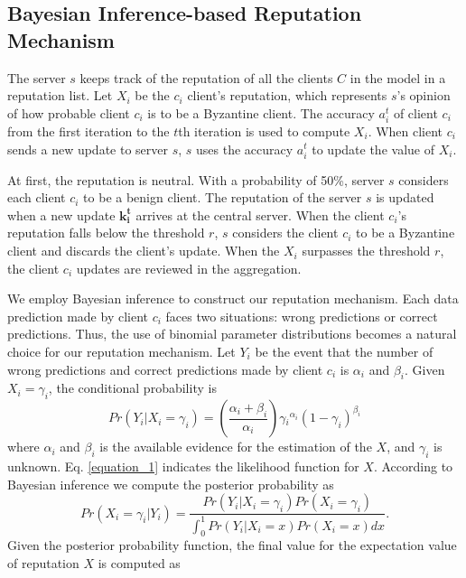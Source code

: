 \documentclass[journal]{IEEEtran}
\begin{document}
\subsection{Bayesian Inference-based Reputation Mechanism}
The server $s$ keeps track of the reputation of all the clients $C$ in the model in a reputation list. Let $X_i$ be the $c_i$ client's reputation, which represents $s$'s opinion of how probable client $c_i$ is to be a Byzantine client. The accuracy $a_i^t$ of client $c_i$ from the first iteration to the $t$th iteration is used to compute $X_i$. When client $c_i$ sends a new update to server $s$, $s$ uses the accuracy $a_i^t$ to update the value of $X_i$.
\par At first, the reputation is neutral. With a probability of 50\%, server $s$ considers each client $c_i$ to be a benign client. The reputation of the server $s$ is updated when a new update $\mathbf{k_i^t}$ arrives at the central server. When the client $c_i$'s reputation falls below the threshold $r$, $s$ considers the client $c_i$ to be a Byzantine client and discards the client's update. When the $X_i$ surpasses the threshold $r$, the client $c_i$ updates are reviewed in the aggregation.
\par We employ Bayesian inference to construct our reputation mechanism. Each data prediction made by client $c_i$ faces two situations: wrong predictions or correct predictions. Thus, the use of binomial parameter distributions becomes a natural choice for our reputation mechanism. Let $Y_i$ be the event that the number of wrong predictions and correct predictions made by client $c_i$ is $\alpha_i$ and $\beta_i$. Given $X_i=\gamma_i$, the conditional probability is 
\begin{equation}
  Pr(Y_i|X_i=\gamma _i)=\left ( \frac{\alpha _i+\beta _i}{\alpha _i} \right )\gamma {_{i}}^{\alpha_i}\left ( 1-\gamma_{i} \right )^{\beta_{i}}\label{equation_1}
\end{equation}
where $\alpha_i$ and $\beta_i$ is the available evidence for the estimation of the $X$, and $\gamma_i$ is unknown. Eq. \ref{equation_1} indicates the likelihood function for $X$. According to Bayesian inference we compute the posterior probability as
\begin{equation}
  Pr(X_i=\gamma _i|Y_i)=\frac{Pr\left ( Y_{i}|X_{i}=\gamma_{i} \right )Pr(X_{i}=\gamma_{i})}{\int_{0}^{1}Pr\left ( Y_{i}|X_{i}=x \right )Pr(X_{i}=x)dx}\label{equation_2}.
\end{equation}
Given the posterior probability function, the final value for the expectation value of reputation $X$ is computed as
\end{document}
